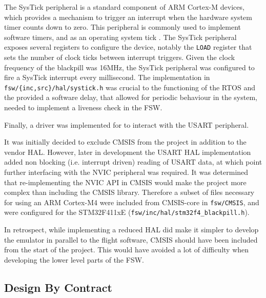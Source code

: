 \documentclass[../report.tex]{subfiles}
\begin{document}
The SysTick peripheral is a standard component of ARM Cortex-M devices, which
provides a mechanism to trigger an interrupt when the hardware system timer
counts down to zero. This peripheral is commonly used to implement software
timers, and as an operating system tick \citep{armcm4_manual}. The SysTick
peripheral exposes several registers to configure the device, notably the
\lstinline|LOAD| register that sets the number of clock ticks between interrupt
triggers. Given the clock frequency of the blackpill was 16MHz, the SysTick
peripheral was configured to fire a SysTick interrupt every millisecond. The
implementation in \lstinline|fsw/{inc,src}/hal/systick.h| was crucial to the
functioning of the RTOS and the provided a software delay, that allowed for
periodic behaviour in the system, needed to implement a liveness check in the
FSW.


Finally, a driver was implemented for to interact with the USART peripheral.


It was initially decided to exclude CMSIS from the project in addition to the
vendor HAL. However, later in development the USART HAL implementation added
non blocking (i.e. interrupt driven) reading of USART data, at which point
further interfacing with the NVIC peripheral was required. It was determined
that re-implementing the NVIC API in CMSIS would make the project more complex
than including the CMSIS library. Therefore a subset of files necessary for
using an ARM Cortex-M4 were included from CMSIS-core \citep{CMSIS} in
\lstinline|fsw/CMSIS|, and were configured for the STM32F411xE
(\lstinline|fsw/inc/hal/stm32f4_blackpill.h|).

In retrospect, while implementing a reduced HAL did make it simpler to develop
the emulator in parallel to the flight software, CMSIS should have been
included from the start of the project. This would have avoided a lot of
difficulty when developing the lower level parts of the FSW.

\subsection{Design By Contract}
\end{document}
